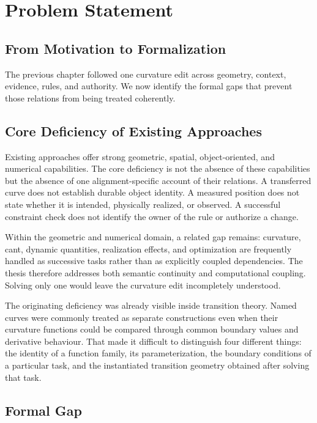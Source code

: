 
\chapter{Problem Statement}

\section{From Motivation to Formalization}

The previous chapter followed one curvature edit across geometry, context,
evidence, rules, and authority. We now identify the formal gaps that prevent
those relations from being treated coherently.

\section{Core Deficiency of Existing Approaches}

Existing approaches offer strong geometric, spatial, object-oriented, and
numerical capabilities. The core deficiency is not the absence of these
capabilities but the absence of one alignment-specific account of their
relations. A transferred curve does not establish durable object identity. A
measured position does not state whether it is intended, physically realized,
or observed. A successful constraint check does not identify the owner of the
rule or authorize a change.

Within the geometric and numerical domain, a related gap remains: curvature,
cant, dynamic quantities, realization effects, and optimization are frequently
handled as successive tasks rather than as explicitly coupled dependencies.
The thesis therefore addresses both semantic continuity and computational
coupling. Solving only one would leave the curvature edit incompletely
understood.

The originating deficiency was already visible inside transition theory.
Named curves were commonly treated as separate constructions even when their
curvature functions could be compared through common boundary values and
derivative behaviour. That made it difficult to distinguish four different
things: the identity of a function family, its parameterization, the boundary
conditions of a particular task, and the instantiated transition geometry
obtained after solving that task.

\section{Formal Gap}

